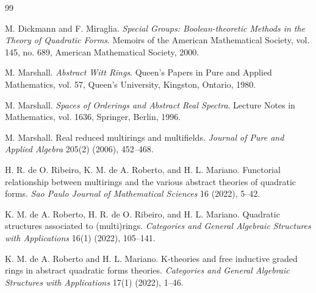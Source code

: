 \documentclass[a4paper,10pt]{article}
\begin{document}
\begin{thebibliography}{99}

M. Dickmann and F. Miraglia.
\newblock \emph{Special Groups: Boolean-theoretic Methods in the Theory of Quadratic Forms}.
\newblock Memoirs of the American Mathematical Society, vol. 145, no. 689, American Mathematical Society, 2000.

M. Marshall.
\newblock \emph{Abstract Witt Rings}.
\newblock Queen's Papers in Pure and Applied Mathematics, vol. 57, Queen's University, Kingston, Ontario, 1980.

M. Marshall.
\newblock \emph{Spaces of Orderings and Abstract Real Spectra}.
\newblock Lecture Notes in Mathematics, vol. 1636, Springer, Berlin, 1996.

M. Marshall.
\newblock Real reduced multirings and multifields.
\newblock \emph{Journal of Pure and Applied Algebra} 205(2) (2006), 452--468.

H. R. de O. Ribeiro, K. M. de A. Roberto, and H. L. Mariano.
\newblock Functorial relationship between multirings and the various abstract theories of quadratic forms.
\newblock \emph{Sao Paulo Journal of Mathematical Sciences} 16 (2022), 5--42.

K. M. de A. Roberto, H. R. de O. Ribeiro, and H. L. Mariano.
\newblock Quadratic structures associated to (multi)rings.
\newblock \emph{Categories and General Algebraic Structures with Applications} 16(1) (2022), 105--141.

K. M. de A. Roberto and H. L. Mariano.
\newblock K-theories and free inductive graded rings in abstract quadratic forms theories.
\newblock \emph{Categories and General Algebraic Structures with Applications} 17(1) (2022), 1--46.

\end{thebibliography}
\end{document}
